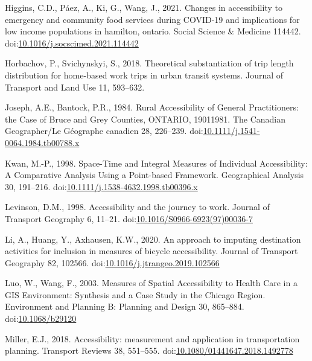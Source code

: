 \documentclass[]{elsarticle} %
\newlength{\cslhangindent}
\newlength{\cslentryspacingunit} %
\newenvironment{CSLReferences}[2] %
 {%
  \setlength{\parindent}{0pt}
  \ifodd #1
  \let\oldpar\par
  \def\par{\hangindent=\cslhangindent\oldpar}
  \fi
  \setlength{\parskip}{#2\cslentryspacingunit}
 }%
 {}
\begin{document}
\begin{CSLReferences}{1}{0}
\leavevmode{}%
Higgins, C.D., Páez, A., Ki, G., Wang, J., 2021. Changes in
accessibility to emergency and community food services during COVID-19
and implications for low income populations in hamilton, ontario. Social
Science \& Medicine 114442.
doi:\href{https://doi.org/10.1016/j.socscimed.2021.114442}{10.1016/j.socscimed.2021.114442}

\leavevmode{}%
Horbachov, P., Svichynskyi, S., 2018. Theoretical substantiation of trip
length distribution for home-based work trips in urban transit systems.
Journal of Transport and Land Use 11, 593--632.

\leavevmode{}%
Joseph, A.E., Bantock, P.R., 1984. Rural Accessibility of General
Practitioners: the Case of Bruce and Grey Counties, ONTARIO,
1901{\textendash}1981. The Canadian Geographer/Le Géographe canadien 28,
226--239.
doi:\href{https://doi.org/10.1111/j.1541-0064.1984.tb00788.x}{10.1111/j.1541-0064.1984.tb00788.x}

\leavevmode{}%
Kwan, M.-P., 1998. Space-{Time} and {Integral} {Measures} of
{Individual} {Accessibility}: {A} {Comparative} {Analysis} {Using} a
{Point}-based {Framework}. Geographical Analysis 30, 191--216.
doi:\href{https://doi.org/10.1111/j.1538-4632.1998.tb00396.x}{10.1111/j.1538-4632.1998.tb00396.x}

\leavevmode{}%
Levinson, D.M., 1998. Accessibility and the journey to work. Journal of
Transport Geography 6, 11--21.
doi:\href{https://doi.org/10.1016/S0966-6923(97)00036-7}{10.1016/S0966-6923(97)00036-7}

\leavevmode{}%
Li, A., Huang, Y., Axhausen, K.W., 2020. An approach to imputing
destination activities for inclusion in measures of bicycle
accessibility. Journal of Transport Geography 82, 102566.
doi:\href{https://doi.org/10.1016/j.jtrangeo.2019.102566}{10.1016/j.jtrangeo.2019.102566}

\leavevmode{}%
Luo, W., Wang, F., 2003. Measures of Spatial Accessibility to Health
Care in a GIS Environment: Synthesis and a Case Study in the Chicago
Region. Environment and Planning B: Planning and Design 30, 865--884.
doi:\href{https://doi.org/10.1068/b29120}{10.1068/b29120}

\leavevmode{}%
Miller, E.J., 2018. Accessibility: measurement and application in
transportation planning. Transport Reviews 38, 551--555.
doi:\href{https://doi.org/10.1080/01441647.2018.1492778}{10.1080/01441647.2018.1492778}


\end{CSLReferences}
\end{document}

